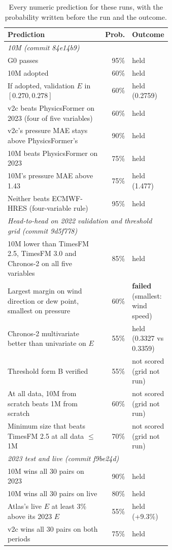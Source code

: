\documentclass{article}
\begin{document}
\begin{table}[H]
\caption{Every numeric prediction for these runs, with the probability written before the run and the outcome.}
\label{tab:pred}
\centering\scriptsize
\begin{tabular}{p{0.64\linewidth}rl}
\toprule
Prediction & Prob. & Outcome\\
\midrule
\multicolumn{3}{l}{\emph{10M (commit 84e14b9)}}\\
G0 passes & 95\% & held\\
10M adopted & 60\% & held\\
If adopted, validation $E$ in $[0.270,0.278]$ & 60\% & held (0.2759)\\
v2c beats PhysicsFormer on 2023 (four of five variables) & 60\% & held\\
v2c's pressure MAE stays above PhysicsFormer's & 90\% & held\\
10M beats PhysicsFormer on 2023 & 75\% & held\\
10M's pressure MAE above 1.43 & 75\% & held (1.477)\\
Neither beats ECMWF-HRES (four-variable rule) & 95\% & held\\
\multicolumn{3}{l}{\emph{Head-to-head on 2022 validation and threshold grid (commit 9d5f778)}}\\
10M lower than TimesFM 2.5, TimesFM 3.0 and Chronos-2 on all five variables & 85\% & held\\
Largest margin on wind direction or dew point, smallest on pressure & 60\% & \textbf{failed} (smallest: wind speed)\\
Chronos-2 multivariate better than univariate on $E$ & 55\% & held (0.3327 vs 0.3359)\\
Threshold form B verified & 55\% & not scored (grid not run)\\
At all data, 10M from scratch beats 1M from scratch & 60\% & not scored (grid not run)\\
Minimum size that beats TimesFM 2.5 at all data $\le$1M & 70\% & not scored (grid not run)\\
\multicolumn{3}{l}{\emph{2023 test and live (commit f9be24d)}}\\
10M wins all 30 pairs on 2023 & 90\% & held\\
10M wins all 30 pairs on live & 80\% & held\\
Atlas's live $E$ at least 3\% above its 2023 $E$ & 55\% & held (+9.3\%)\\
v2c wins all 30 pairs on both periods & 75\% & held\\

\end{tabular}
\end{table}
\end{document}
